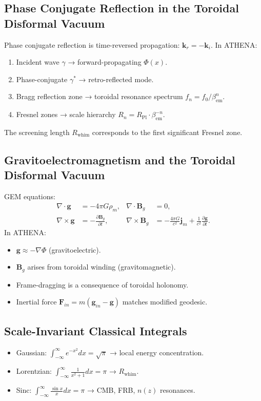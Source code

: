 \documentclass[12pt, a4paper]{article}
\begin{document}
\subsection{Phase Conjugate Reflection in the Toroidal Disformal Vacuum}
\label{sec:phase_conjugate}
Phase conjugate reflection is time-reversed propagation: $\mathbf{k}_r = -\mathbf{k}_i$. In ATHENA:
\begin{enumerate}
    \item Incident wave $\gamma$ → forward-propagating $\Phi(x)$.
    \item Phase-conjugate $\gamma^*$ → retro-reflected mode.
    \item Bragg reflection zone → toroidal resonance spectrum $f_n = f_0 / \beta_{\mathrm{em}}^n$.
    \item Fresnel zones → scale hierarchy $R_n = R_{\mathrm{Pl}} \cdot \beta_{\mathrm{em}}^{-n}$.
\end{enumerate}
The screening length $R_{\mathrm{whim}}$ corresponds to the first significant Fresnel zone.

\subsection{Gravitoelectromagnetism and the Toroidal Disformal Vacuum}
\label{sec:gem}
GEM equations:
\begin{align}
\nabla \cdot \mathbf{g} &= -4\pi G \rho_m, &
\nabla \cdot \mathbf{B}_g &= 0, \\
\nabla \times \mathbf{g} &= -\frac{\partial \mathbf{B}_g}{\partial t}, &
\nabla \times \mathbf{B}_g &= -\frac{4\pi G}{c^2} \mathbf{j}_m + \frac{1}{c^2} \frac{\partial \mathbf{g}}{\partial t}.
\label{eq:gem_eqs}
\end{align}
In ATHENA:
\begin{itemize}
    \item $\mathbf{g} \approx -\nabla \Phi$ (gravitoelectric).
    \item $\mathbf{B}_g$ arises from toroidal winding (gravitomagnetic).
    \item Frame-dragging is a consequence of toroidal holonomy.
    \item Inertial force $\mathbf{F}_{in} = m(\mathbf{g}_{in} - \mathbf{g})$ matches modified geodesic.
\end{itemize}

\subsection{Scale-Invariant Classical Integrals}
\begin{itemize}
    \item Gaussian: $\int_{-\infty}^{\infty} e^{-x^2} dx = \sqrt{\pi}$ → local energy concentration.
    \item Lorentzian: $\int_{-\infty}^{\infty} \frac{1}{x^2+1} dx = \pi$ → $R_{\mathrm{whim}}$.
    \item Sinc: $\int_{-\infty}^{\infty} \frac{\sin x}{x} dx = \pi$ → CMB, FRB, $n(z)$ resonances.
\end{itemize}
\end{document}
